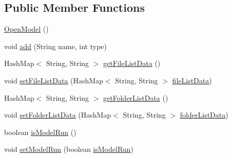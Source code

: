 \subsection*{Public Member Functions}
\begin{DoxyCompactItemize}
\item 
\hyperlink{classcom_1_1poly_1_1nlp_1_1filekommander_1_1views_1_1models_1_1_open_model_a9624aa59e2e9a77a6a09f2ec0fb20b34}{Open\-Model} ()
\item 
void \hyperlink{classcom_1_1poly_1_1nlp_1_1filekommander_1_1views_1_1models_1_1_open_model_a602735148358250e49a86583517b58a2}{add} (String name, int type)
\item 
Hash\-Map$<$ String, String $>$ \hyperlink{classcom_1_1poly_1_1nlp_1_1filekommander_1_1views_1_1models_1_1_open_model_a188833367eaa0547760c2eb156f83a93}{get\-File\-List\-Data} ()
\item 
void \hyperlink{classcom_1_1poly_1_1nlp_1_1filekommander_1_1views_1_1models_1_1_open_model_af1dca02c1129cc14a4b77489aed147c0}{set\-File\-List\-Data} (Hash\-Map$<$ String, String $>$ \hyperlink{classcom_1_1poly_1_1nlp_1_1filekommander_1_1views_1_1models_1_1_open_model_a1d7cf2afcf4a96977f34712a356662c6}{file\-List\-Data})
\item 
Hash\-Map$<$ String, String $>$ \hyperlink{classcom_1_1poly_1_1nlp_1_1filekommander_1_1views_1_1models_1_1_open_model_aa91a0f55a062cec0e4ba825482847fe4}{get\-Folder\-List\-Data} ()
\item 
void \hyperlink{classcom_1_1poly_1_1nlp_1_1filekommander_1_1views_1_1models_1_1_open_model_ab4cc45df6ad2ed8b606272820cd36a1b}{set\-Folder\-List\-Data} (Hash\-Map$<$ String, String $>$ \hyperlink{classcom_1_1poly_1_1nlp_1_1filekommander_1_1views_1_1models_1_1_open_model_a57caf879510112ad16fbe357014d38e8}{folder\-List\-Data})
\item 
boolean \hyperlink{classcom_1_1poly_1_1nlp_1_1filekommander_1_1views_1_1models_1_1_open_model_a7637685b17f9097f35cb73d335746e3a}{is\-Model\-Run} ()
\item 
void \hyperlink{classcom_1_1poly_1_1nlp_1_1filekommander_1_1views_1_1models_1_1_open_model_a04ac5d70d33cbd2483c6c46bfa7c889d}{set\-Model\-Run} (boolean \hyperlink{classcom_1_1poly_1_1nlp_1_1filekommander_1_1views_1_1models_1_1_open_model_a103a22e09cd8bbe1a6ddbdf92b27bc11}{is\-Model\-Run})
\end{DoxyCompactItemize}
